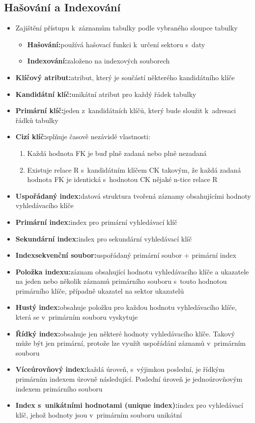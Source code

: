 \documentclass[a4paper,10pt]{article}
\newcommand{\pojem}[2]{\item \textbf{#1:}\quad #2}
\begin{document}
		\subsection{Hašování a Indexování}
			\begin{itemize}
				\item Zajištění přístupu k~záznamům tabulky podle vybraného sloupce tabulky
				\begin{itemize}
					\pojem{Hašování}{používá hašovací funkci k~určení sektoru s~daty}
					\pojem{Indexování}{založeno na indexových souborech}
				\end{itemize}

				\pojem{Klíčový atribut}{atribut, který je součástí některého kandidátního klíče}
				\pojem{Kandidátní klíč}{unikátní atribut pro každý řádek tabulky}
				\pojem{Primární klíč}{jeden z~kandidátních klíčů, který bude sloužit k~adresaci řádků tabulky}
				\pojem{Cizí klíč}{splňuje časově nezávislé vlastnosti:}
				\begin{enumerate}
					\item Každá hodnota FK je buď plně zadaná nebo plně nezadaná
					\item Existuje relace R s~kandidátním klíčem CK takovým, že každá zadaná hodnota FK je identická s~hodnotou CK nějaké n-tice relace R
				\end{enumerate}
				
				\pojem{Uspořádaný index}{datová struktura tvořená záznamy obsahujícími hodnoty vyhledávacího klíče}

				\pojem{Primární index}{index pro primární vyhledávací klíč}

				\pojem{Sekundární index}{index pro sekundární vyhledávací klíč}

				\pojem{Indexsekvenční soubor}{uspořádaný primární soubor + primární index}

				\pojem{Položka indexu}{záznam obsahující hodnotu vyhledávacího klíče a ukazatele na jeden nebo několik záznamů primárního souboru s~touto hodnotou primárního klíče, případně ukazatel na sektor ukazatelů}

				\pojem{Hustý index}{obsahuje položku pro každou hodnotu vyhledávacího klíče, která se v~primárním souboru vyskytuje}

				\pojem{Řídký index}{obsahuje jen některé hodnoty vyhledávacího klíče. Takový může být jen primární, protože lze využít uspořádání záznamů v~primárním souboru}

				\pojem{Víceúrovňový index}{každá úroveň, s~výjimkou poslední, je řídkým primárním indexem úrovně následující. Poslední úroveň je jednoúrovňovým indexem primárního souboru}

				\pojem{Index s~unikátními hodnotami (unique index)}{index pro vyhledávací klíč, jehož hodnoty jsou v~primárním souboru unikátní}
			\end{itemize}
\end{document}
